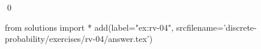 
\begin{ex} 
  \label{ex:rv-04}
  
  \qed
\end{ex} 
\begin{python0}
from solutions import *
add(label="ex:rv-04",
    srcfilename='discrete-probability/exercises/rv-04/answer.tex') 
\end{python0}
